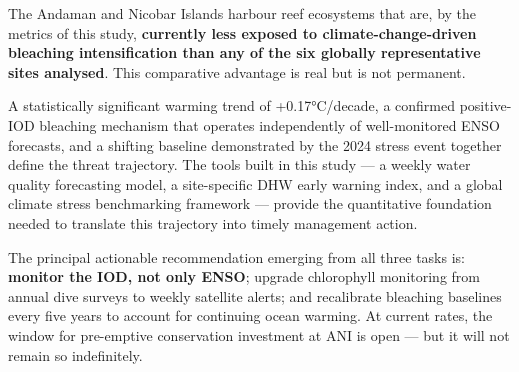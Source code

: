 \documentclass[12pt,a4paper]{report}
\begin{document}
\begin{findingbox}
The Andaman and Nicobar Islands harbour reef ecosystems that are, by the metrics of
this study, \textbf{currently less exposed to climate-change-driven bleaching
intensification than any of the six globally representative sites analysed}.
This comparative advantage is real but is not permanent.

A statistically significant warming trend of +0.17°C/decade, a confirmed positive-IOD
bleaching mechanism that operates independently of well-monitored ENSO forecasts,
and a shifting baseline demonstrated by the 2024 stress event together define the
threat trajectory. The tools built in this study — a weekly water quality forecasting
model, a site-specific DHW early warning index, and a global climate stress benchmarking
framework — provide the quantitative foundation needed to translate this trajectory
into timely management action.

The principal actionable recommendation emerging from all three tasks is:
\textbf{monitor the IOD, not only ENSO}; upgrade chlorophyll monitoring from annual
dive surveys to weekly satellite alerts; and recalibrate bleaching baselines every
five years to account for continuing ocean warming.
At current rates, the window for pre-emptive conservation investment at ANI is
open — but it will not remain so indefinitely.
\end{findingbox}

\end{document}
